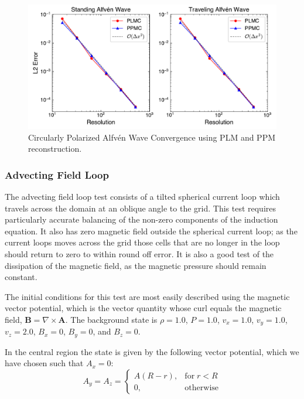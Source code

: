 \begin{figure}[ht!]
    \includegraphics[width=\linewidth]{assets/3-mhd-tests/cpaw_convergence.pdf}
    \caption{Circularly Polarized Alfv\'en Wave Convergence using PLM and PPM reconstruction. }
    \label{fig:cpaw}
\end{figure}

\subsubsection{Advecting Field Loop}
\label{sec:afl}

The advecting field loop test consists of a tilted spherical current loop which travels across the domain at an oblique angle to the grid. This test requires particularly accurate balancing of the non-zero components of the induction equation. It also has zero magnetic field outside the spherical current loop; as the current loops moves across the grid those cells that are no longer in the loop should return to zero to within round off error. It is also a good test of the dissipation of the magnetic field, as the magnetic pressure should remain constant.

The initial conditions for this test are most easily described using the magnetic vector potential, which is the vector quantity whose curl equals the magnetic field, $\boldsymbol{B} = \nabla \times\boldsymbol{A}$. The background state is
$\rho = 1.0$,
$P = 1.0$,
$v_x = 1.0$,
$v_y = 1.0$,
$v_z = 2.0$,
$B_x = 0$,
$B_y = 0$, and
$B_z = 0$.

In the central region the state is given by the following vector potential, which we have chosen such that $A_x = 0$:
\begin{equation}
    A_y = A_z = 
    \begin{cases}
        A \left( R - r \right),& \text{for}\; r < R\\
        0,              & \text{otherwise}
    \end{cases}
\end{equation}

